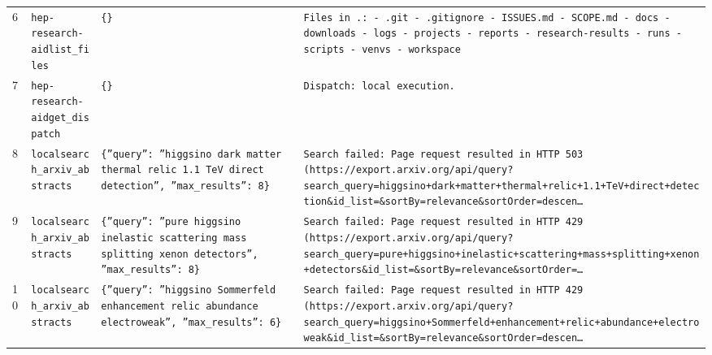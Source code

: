\documentclass[11pt,a4paper]{article}
\begin{document}
\begin{longtable}{@{}p{}p{}p{}p{}@{}}
6 & \texttt{hep-research-aid}\newline\texttt{list\_\allowbreak{}files} & \texttt{\{\}\allowbreak{}} & \texttt{Files in .:\allowbreak{}   - .git   - .gitignore   - ISSUES.md   - SCOPE.md   - docs   - downloads   - logs   - projects   - reports   - research-results   - runs   - scripts   - venvs   - workspace} \\
7 & \texttt{hep-research-aid}\newline\texttt{get\_\allowbreak{}dispatch} & \texttt{\{\}\allowbreak{}} & \texttt{Dispatch:\allowbreak{} local execution.} \\
8 & \texttt{local}\newline\texttt{search\_\allowbreak{}arxiv\_\allowbreak{}abstracts} & \texttt{\{''query'':\allowbreak{} ''higgsino dark matter thermal relic 1.1 TeV direct detection'',\allowbreak{} ''max\_\allowbreak{}results'':\allowbreak{} 8\}\allowbreak{}} & \texttt{Search failed:\allowbreak{} Page request resulted in HTTP 503 (https:\allowbreak{}/\allowbreak{}/\allowbreak{}export.arxiv.org/\allowbreak{}api/\allowbreak{}query?search\_\allowbreak{}query=\allowbreak{}higgsino+dark+matter+thermal+relic+1.1+TeV+direct+detection\&id\_\allowbreak{}list=\allowbreak{}\&sortBy=\allowbreak{}relevance\&sortOrder=\allowbreak{}descen\ldots{}\allowbreak{}} \\
9 & \texttt{local}\newline\texttt{search\_\allowbreak{}arxiv\_\allowbreak{}abstracts} & \texttt{\{''query'':\allowbreak{} ''pure higgsino inelastic scattering mass splitting xenon detectors'',\allowbreak{} ''max\_\allowbreak{}results'':\allowbreak{} 8\}\allowbreak{}} & \texttt{Search failed:\allowbreak{} Page request resulted in HTTP 429 (https:\allowbreak{}/\allowbreak{}/\allowbreak{}export.arxiv.org/\allowbreak{}api/\allowbreak{}query?search\_\allowbreak{}query=\allowbreak{}pure+higgsino+inelastic+scattering+mass+splitting+xenon+detectors\&id\_\allowbreak{}list=\allowbreak{}\&sortBy=\allowbreak{}relevance\&sortOrder=\allowbreak{}\ldots{}\allowbreak{}} \\
10 & \texttt{local}\newline\texttt{search\_\allowbreak{}arxiv\_\allowbreak{}abstracts} & \texttt{\{''query'':\allowbreak{} ''higgsino Sommerfeld enhancement relic abundance electroweak'',\allowbreak{} ''max\_\allowbreak{}results'':\allowbreak{} 6\}\allowbreak{}} & \texttt{Search failed:\allowbreak{} Page request resulted in HTTP 429 (https:\allowbreak{}/\allowbreak{}/\allowbreak{}export.arxiv.org/\allowbreak{}api/\allowbreak{}query?search\_\allowbreak{}query=\allowbreak{}higgsino+Sommerfeld+enhancement+relic+abundance+electroweak\&id\_\allowbreak{}list=\allowbreak{}\&sortBy=\allowbreak{}relevance\&sortOrder=\allowbreak{}descen\ldots{}\allowbreak{}} \\

\end{longtable}
\end{document}
